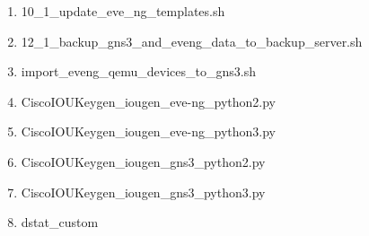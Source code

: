 \begin{enumerate}[noitemsep,label*=\thesection.\arabic*.]
\begin{enumerate}[noitemsep,label*=\arabic*.]
        \begin{enumerate}[noitemsep,label*=\arabic*.]
            \item \label{item:uprava_sablon_skript} 10\_1\_update\_eve\_ng\_templates.sh
            \item \label{item:backup_script} 12\_1\_backup\_gns3\_and\_eveng\_data\_to\_backup\_server.sh
            \item \label{item:gns3_import_skript} import\_eveng\_qemu\_devices\_to\_gns3.sh
            \item CiscoIOUKeygen\_iougen\_eve-ng\_python2.py
            \item CiscoIOUKeygen\_iougen\_eve-ng\_python3.py
            \item CiscoIOUKeygen\_iougen\_gns3\_python2.py
            \item CiscoIOUKeygen\_iougen\_gns3\_python3.py
            \item dstat\_custom
        \end{enumerate}
        

\end{enumerate}
\end{enumerate}
